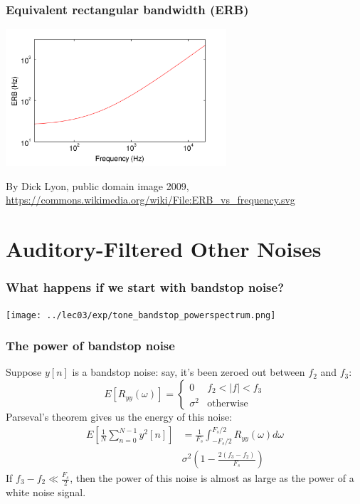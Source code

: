 \documentclass{beamer}
\begin{document}
\begin{frame}
  \frametitle{Equivalent rectangular bandwidth (ERB)}

  \centerline{\includegraphics[height=2in]{2560px-ERB_vs_frequency.png}}
  \begin{tiny}
    By Dick Lyon, public domain image 2009,
    \url{https://commons.wikimedia.org/wiki/File:ERB_vs_frequency.svg}
  \end{tiny}
\end{frame}

\section[Bandstop]{Auditory-Filtered Other Noises}
\setcounter{subsection}{1}

\begin{frame}
  \frametitle{What happens if we start with bandstop noise?}

  \centerline{\texttt{[image: ../lec03/exp/tone\_bandstop\_powerspectrum.png]}}
\end{frame}

\begin{frame}
  \frametitle{The power of bandstop noise}

  Suppose $y[n]$ is a bandstop noise: say, it's been zeroed out between $f_2$ and $f_3$:
  \[
  E\left[R_{yy}(\omega)\right] = \begin{cases}
    0 & f_2 < |f| < f_3\\
    \sigma^2 &  \mbox{otherwise}
  \end{cases}
  \]
  Parseval's theorem gives us the energy of this noise:
  \begin{align*}
    E\left[\frac{1}{N}\sum_{n=0}^{N-1}y^2[n]\right]
    &=\frac{1}{F_s}\int_{-F_s/2}^{F_s/2} R_{yy}(\omega)d\omega\\
    & \sigma^2\left(1-\frac{2(f_3-f_2)}{F_s}\right)
  \end{align*}
  If $f_3-f_2\ll \frac{F_s}{2}$, then the power of this noise is
  almost as large as the power of a white noise signal.
\end{frame}
\end{document}
